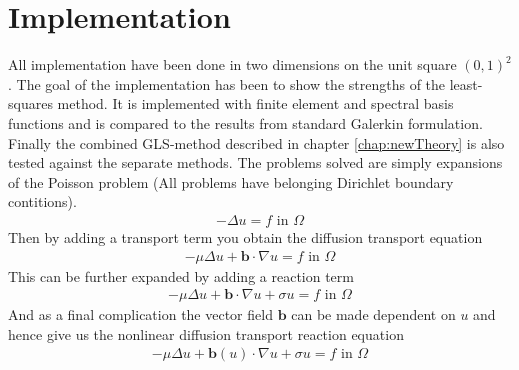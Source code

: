 
\chapter{Implementation} %

\label{chap:Implementation} %



All implementation have been done in two dimensions on the unit square $(0,1)^2$. The goal of the implementation has been to show the strengths of the least-squares method. It is implemented with finite element and spectral basis functions and is compared to the results from standard Galerkin formulation. Finally the combined GLS-method described in chapter \ref{chap:newTheory} is also tested against the separate methods. The problems solved are simply expansions of the Poisson problem (All problems have belonging Dirichlet boundary contitions). 
\begin{align}
	-\Delta u = f \text{  in  } \Omega
	\label{eq:PossionImplementation}
\end{align}
Then by adding a transport term you obtain the diffusion transport equation
\begin{align}
	-\mu \Delta u + \mathbf{b} \cdot \nabla u = f \text{ in } \Omega
	\label{eq:DiffTransImplementation}
\end{align}
This can be further expanded by adding a reaction term
\begin{align}
	-\mu \Delta u + \mathbf{b} \cdot \nabla u +\sigma u = f \text{ in } \Omega
	\label{eq:ReactionImplementation}
\end{align}
And as a final complication the vector field $\mathbf{b}$ can be made dependent on $u$ and hence give us the nonlinear diffusion transport reaction equation
\begin{align}
	-\mu \Delta u + \mathbf{b}(u) \cdot \nabla u +\sigma u = f \text{ in } \Omega
	\label{eq:ReactionImplementation}
\end{align}

